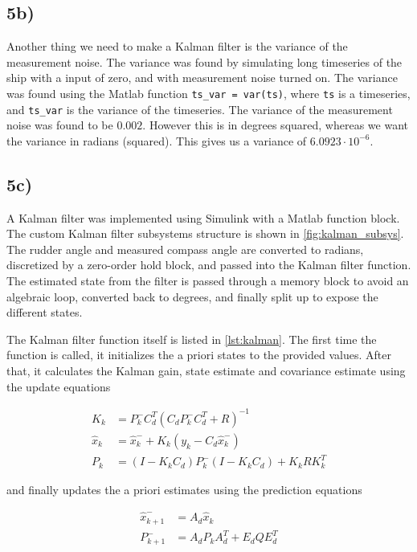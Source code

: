 \subsection{5b)}

Another thing we need to make a Kalman filter is the variance of the measurement noise. The variance was found by simulating long timeseries of the ship with a input of zero, and with measurement noise turned on. The variance was found using the Matlab function \texttt{ts\_var = var(ts)}, where \texttt{ts} is a timeseries, and \texttt{ts\_var} is the variance of the timeseries. The variance of the measurement noise was found to be $0.002$. However this is in degrees squared, whereas we want the variance in radians (squared). This gives us a variance of $6.0923 \cdot 10^{-6}$.

\subsection{5c)}

A Kalman filter was implemented using Simulink with a Matlab function block. The custom Kalman filter subsystems structure is shown in \cref{fig:kalman_subsys}. The rudder angle and measured compass angle are converted to radians, discretized by a zero-order hold block, and passed into the Kalman filter function. The estimated state from the filter is passed through a memory block to avoid an algebraic loop, converted back to degrees, and finally split up to expose the different states.

The Kalman filter function itself is listed in \cref{lst:kalman}. The first time the function is called, it initializes the a priori states to the provided values. After that, it calculates the Kalman gain, state estimate and covariance estimate using the update equations

\begin{subequations}
    \begin{align}
        K_k &= P_k^-C_d^T(C_dP_k^-C_d^T+R)^{-1} \\
        \hat{x}_k &= \hat{x}_k^- + K_k(y_k - C_d\hat{x}_k^-) \\
        P_k &= (I - K_kC_d)P_k^-(I-K_kC_d) + K_kRK_k^T
    \end{align}

\end{subequations}

and finally updates the a priori estimates using the prediction equations

\begin{subequations}
    \begin{align}
        \hat{x}_{k+1}^- &= A_d\hat{x}_k \\
        P_{k+1}^- &= A_d P_k A_d^T + E_d Q E_d^T
    \end{align}

\end{subequations}

